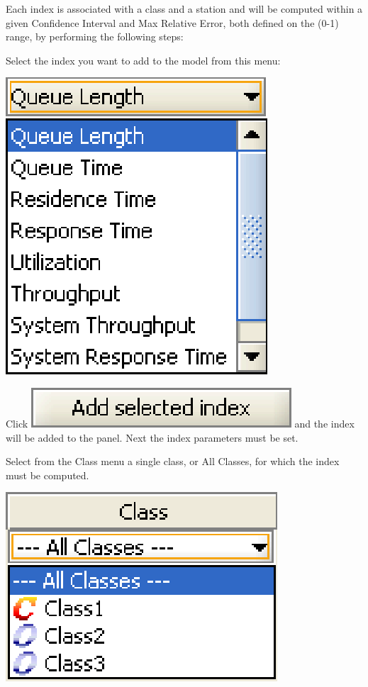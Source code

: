 Each index is associated with a class and a station and will be computed within a given Confidence Interval and Max Relative Error, both defined on the (0-1) range, by performing the following steps:
\begin{enumerate*}
\item Select the index you want to add to the model from this menu:
\begin{center}
\includegraphics[scale=.5]{img/jsim/indices1.eps}
\end{center}
\item Click \includegraphics[scale=.5]{img/jsim/add_indice.eps} and the index will be added to the panel. Next the index parameters must be set.
\item Select from the Class menu a single class, or All Classes, for which the index must be computed.
\begin{center}
\includegraphics[scale=.5]{img/jsim/classes.eps}

\end{center}
\end{enumerate*}
